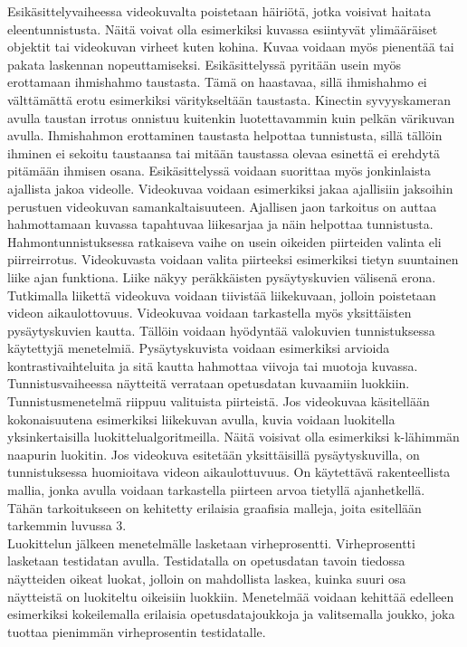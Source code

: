 Esikäsittelyvaiheessa videokuvalta poistetaan häiriötä, jotka voisivat haitata eleentunnistusta.
Näitä voivat olla esimerkiksi kuvassa esiintyvät ylimääräiset objektit tai videokuvan virheet kuten kohina.
Kuvaa voidaan myös pienentää tai pakata laskennan nopeuttamiseksi. Esikäsittelyssä pyritään usein myös erottamaan ihmishahmo taustasta. Tämä on haastavaa, sillä
ihmishahmo ei välttämättä erotu esimerkiksi väritykseltään taustasta. Kinectin syvyyskameran avulla taustan irrotus onnistuu kuitenkin luotettavammin kuin pelkän 
värikuvan avulla. Ihmishahmon erottaminen taustasta helpottaa tunnistusta, sillä tällöin ihminen ei sekoitu taustaansa tai mitään taustassa olevaa
esinettä ei erehdytä pitämään ihmisen osana. Esikäsittelyssä voidaan suorittaa myös jonkinlaista ajallista jakoa videolle. Videokuvaa
voidaan esimerkiksi jakaa ajallisiin jaksoihin perustuen videokuvan samankaltaisuuteen. Ajallisen jaon 
tarkoitus on auttaa hahmottamaan kuvassa tapahtuvaa liikesarjaa ja näin helpottaa tunnistusta. \citep{6239178} \\

Hahmontunnistuksessa ratkaiseva vaihe on usein oikeiden piirteiden valinta eli piirreirrotus. \citep{patternreg} Videokuvasta voidaan valita piirteeksi esimerkiksi 
tietyn suuntainen liike ajan funktiona. Liike näkyy peräkkäisten pysäytyskuvien välisenä erona. Tutkimalla liikettä
videokuva voidaan tiivistää liikekuvaan, jolloin poistetaan videon aikaulottovuus. Videokuvaa voidaan tarkastella myös yksittäisten pysäytyskuvien kautta. 
Tällöin voidaan hyödyntää valokuvien tunnistuksessa käytettyjä menetelmiä.
Pysäytyskuvista voidaan esimerkiksi arvioida kontrastivaihteluita ja sitä kautta hahmottaa viivoja tai muotoja kuvassa. \citep{6239178}  \\

Tunnistusvaiheessa näytteitä verrataan opetusdatan kuvaamiin luokkiin. Tunnistusmenetelmä riippuu valituista piirteistä.
Jos videokuvaa käsitellään kokonaisuutena esimerkiksi liikekuvan avulla, kuvia voidaan luokitella yksinkertaisilla luokittelualgoritmeilla. 
Näitä voisivat olla esimerkiksi k-lähimmän naapurin luokitin. Jos videokuva esitetään yksittäisillä pysäytyskuvilla, 
on tunnistuksessa huomioitava videon aikaulottuvuus. On käytettävä rakenteellista mallia, jonka avulla voidaan tarkastella piirteen arvoa
tietyllä ajanhetkellä. Tähän tarkoitukseen on kehitetty erilaisia graafisia malleja, joita esitellään tarkemmin luvussa 3. \citep{6239178} \\

Luokittelun jälkeen menetelmälle lasketaan virheprosentti. Virheprosentti lasketaan testidatan avulla.
Testidatalla on opetusdatan tavoin tiedossa näytteiden oikeat luokat, jolloin on mahdollista laskea, kuinka suuri osa
näytteistä on luokiteltu oikeisiin luokkiin. Menetelmää voidaan kehittää edelleen esimerkiksi kokeilemalla erilaisia
opetusdatajoukkoja ja valitsemalla joukko, joka tuottaa pienimmän virheprosentin testidatalle. \citep{patternreg} 

